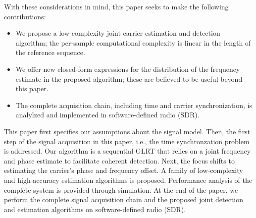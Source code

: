 With these considerations in mind, this paper seeks to make the following contributions:
\begin{itemize}
\item We propose a low-complexity joint carrier estimation and detection algorithm; the per-sample computational complexity is linear
in the length of the reference sequence.
\item We offer new closed-form expressions for the distribution of the frequency estimate in the proposed algorithm; these are believed
to be useful beyond this paper.
\item The complete acquisition chain, including time and carrier synchronization, is analylzed and implemented in software-defined radio (SDR).
\end{itemize}

This paper first specifies our assumptions about the signal
model. Then, the first step of the signal acquisition in this paper, i.e., the time synchronzation
problem is addressed. Our algorithm is a sequential GLRT that relies on a joint frequency and phase
estimate to facilitate coherent detection. Next, the focus shifts to estimating the carrier's phase 
and frequency offset. A family of low-complexity and high-accuracy estimation algorithms is proposed.
Performance analysis of the complete system is provided through simulation. At the end of the paper,
we perform the complete signal acquisition chain and the proposed joint detection and estimation algorithms
on software-defined radio (SDR).




